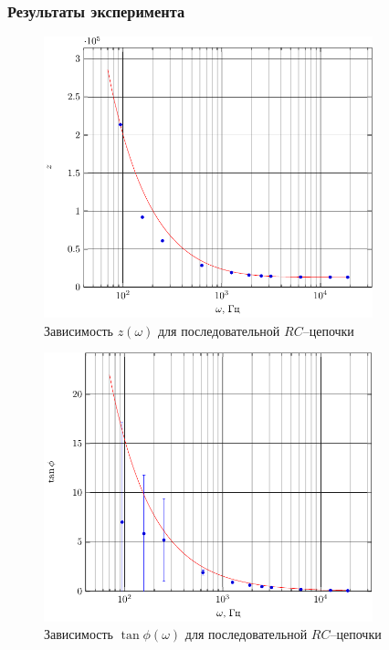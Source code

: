 \subsubsection{Результаты эксперимента}

\begin{figure}[H]
	\centering
	\includegraphics[width=0.85\textwidth]{img/chem1_z}
	\caption{Зависимость $z(\omega)$ для последовательной $RC$--цепочки}
	\label{fig:RC_z}
\end{figure}
\begin{figure}[H]
	\centering
	\includegraphics[width=0.85\textwidth]{img/chem1_phi} 
	\caption{Зависимость $\tan\phi(\omega)$ для последовательной $RC$--цепочки}
	\label{fig:RC_tanphi}
\end{figure}


